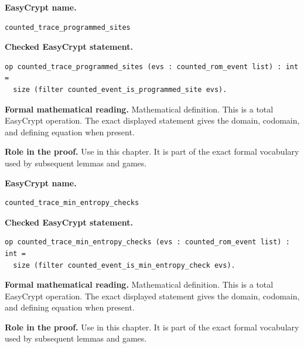 \begin{formaldefinition}
\noindent\textbf{EasyCrypt name.}
\begin{lstlisting}[language=EasyCrypt,basicstyle=\ttfamily\scriptsize]
counted_trace_programmed_sites
\end{lstlisting}
\noindent\textbf{Checked EasyCrypt statement.}
\begin{lstlisting}[language=EasyCrypt,basicstyle=\ttfamily\scriptsize]
op counted_trace_programmed_sites (evs : counted_rom_event list) : int =
  size (filter counted_event_is_programmed_site evs).
\end{lstlisting}
\noindent\textbf{Formal mathematical reading.}
Mathematical definition. This is a total EasyCrypt operation.  The exact displayed statement gives the domain, codomain, and defining equation when present.

\noindent\textbf{Role in the proof.}
Use in this chapter. It is part of the exact formal vocabulary used by subsequent lemmas and games.

\end{formaldefinition}

\begin{formaldefinition}
\noindent\textbf{EasyCrypt name.}
\begin{lstlisting}[language=EasyCrypt,basicstyle=\ttfamily\scriptsize]
counted_trace_min_entropy_checks
\end{lstlisting}
\noindent\textbf{Checked EasyCrypt statement.}
\begin{lstlisting}[language=EasyCrypt,basicstyle=\ttfamily\scriptsize]
op counted_trace_min_entropy_checks (evs : counted_rom_event list) : int =
  size (filter counted_event_is_min_entropy_check evs).
\end{lstlisting}
\noindent\textbf{Formal mathematical reading.}
Mathematical definition. This is a total EasyCrypt operation.  The exact displayed statement gives the domain, codomain, and defining equation when present.

\noindent\textbf{Role in the proof.}
Use in this chapter. It is part of the exact formal vocabulary used by subsequent lemmas and games.

\end{formaldefinition}


